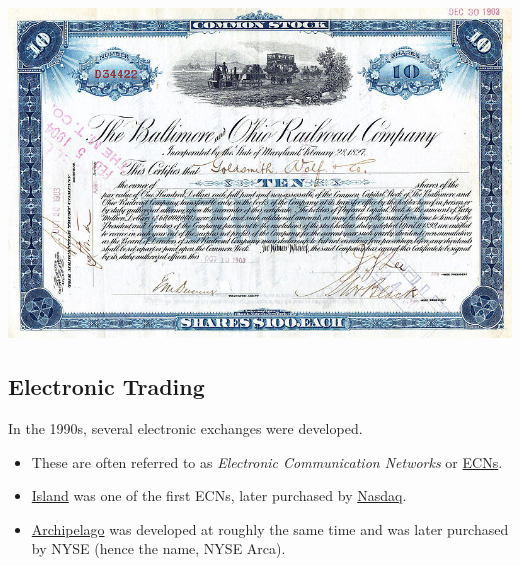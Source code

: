 \documentclass[letterpaper,10pt,english]{sphinxmanual}
\begin{document}
\includegraphics[width=6in]{stockCertificate.png}


\subsection{Electronic Trading}
\label{trading:electronic-trading}
In the 1990s, several electronic exchanges were developed.
\begin{itemize}
\item {} 
These are often referred to as \emph{Electronic Communication Networks}
or \href{http://www.investopedia.com/terms/e/ecn.asp}{ECNs}.

\end{itemize}
\begin{itemize}
\item {} 
\href{http://en.wikipedia.org/wiki/Island\_Exchange}{Island} was one of
the first ECNs, later purchased by \href{http://en.wikipedia.org/wiki/NASDAQ}{Nasdaq}.

\end{itemize}
\begin{itemize}
\item {} 
\href{http://en.wikipedia.org/wiki/Archipelago\_Exchange}{Archipelago}
was developed at roughly the same time and was later purchased by
NYSE (hence the name, NYSE Arca).

\end{itemize}
\end{document}
